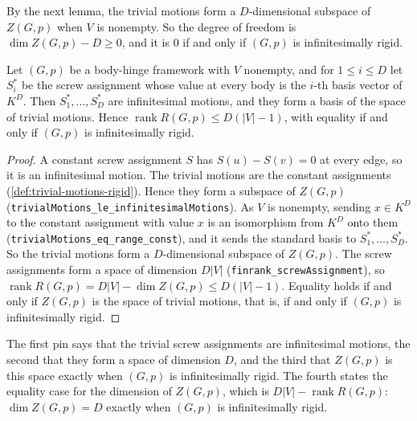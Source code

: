 By the next lemma, the trivial motions form a $D$-dimensional subspace
of $Z(G,p)$ when $V$ is nonempty. So the degree of freedom is
$\dim Z(G,p) - D \ge 0$, and it is $0$ if and only if $(G,p)$ is
infinitesimally rigid.

\begin{lemma}
  \label{lem:trivial-motions-rank-bound}
  \leanok
  Let $(G,p)$ be a body-hinge framework with $V$ nonempty, and for
  $1 \le i \le D$ let $S^*_i$ be the screw assignment whose value at
  every body is the $i$-th basis vector of $K^D$. Then
  $S^*_1, \dots, S^*_D$ are infinitesimal motions, and they form a
  basis of the space of trivial motions. Hence
  $\operatorname{rank} R(G,p) \le D(|V|-1)$, with equality if and only
  if $(G,p)$ is infinitesimally rigid.
\end{lemma}
\begin{proof}
  \leanok
  A constant screw assignment $S$ has $S(u) - S(v) = 0$ at every edge,
  so it is an infinitesimal motion. The trivial motions are the
  constant assignments (\cref{def:trivial-motions-rigid}). Hence they
  form a subspace of $Z(G,p)$
  (\texttt{trivialMotions\_\allowbreak{}le\_\allowbreak{}infinitesimalMotions}).
  As $V$ is nonempty, sending $x \in K^D$ to the constant assignment
  with value $x$ is an isomorphism from $K^D$ onto them
  (\texttt{trivialMotions\_\allowbreak{}eq\_\allowbreak{}range\_\allowbreak{}const}),
  and it sends the standard basis to $S^*_1, \dots, S^*_D$. So the
  trivial motions form a $D$-dimensional subspace of $Z(G,p)$. The
  screw assignments form a space of dimension $D|V|$
  (\texttt{finrank\_\allowbreak{}screwAssignment}), so
  $\operatorname{rank} R(G,p) = D|V| - \dim Z(G,p) \le D(|V|-1)$.
  Equality holds if and only if $Z(G,p)$ is the space of trivial
  motions, that is, if and only if $(G,p)$ is infinitesimally rigid.
\end{proof}

\begin{fmlnote}
  The first pin says that the trivial screw assignments are
  infinitesimal motions, the second that they form a space of dimension
  $D$, and the third that $Z(G,p)$ is this space exactly when $(G,p)$ is
  infinitesimally rigid. The fourth states the equality case for the
  dimension of $Z(G,p)$, which is $D|V| - \operatorname{rank} R(G,p)$:
  $\dim Z(G,p) = D$ exactly when $(G,p)$ is infinitesimally rigid.
\end{fmlnote}

